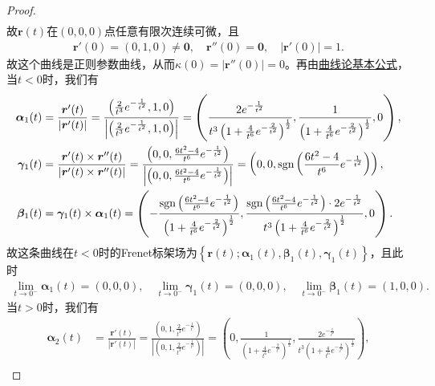 \documentclass[../../main.tex]{subfiles}%
\begin{document}
\begin{proof}
\begin{align*}
\end{align*}
故$\bm{r}(t)$在$(0,0,0)$点任意有限次连续可微，且
\begin{align*}
\bm{r}'(0) = \left( 0,1,0 \right) \ne \bm{0}, \quad \bm{r}''(0) = \bm{0}, \quad |\bm{r}'(0)| = 1.
\end{align*}
故这个曲线是正则参数曲线，从而$\kappa(0) = |\bm{r}''(0)| = 0$。再由\hyperref[theorem:曲线论基本公式]{曲线论基本公式}，当$t<0$时，我们有
\begin{align*}
\bm{\alpha}_1(t) &= \frac{\bm{r}'(t)}{|\bm{r}'(t)|} = \frac{\left( \frac{2}{t^3}e^{-\frac{1}{t^2}},1,0 \right)}{\left| \left( \frac{2}{t^3}e^{-\frac{1}{t^2}},1,0 \right) \right|} = \left( \frac{2e^{-\frac{1}{t^2}}}{t^3\left( 1+\frac{4}{t^6}e^{-\frac{2}{t^2}} \right)^{\frac{1}{2}}},\frac{1}{\left( 1+\frac{4}{t^6}e^{-\frac{2}{t^2}} \right)^{\frac{1}{2}}},0 \right), \\
\bm{\gamma}_1(t) &= \frac{\bm{r}'(t) \times \bm{r}''(t)}{|\bm{r}'(t) \times \bm{r}''(t)|} = \frac{\left( 0,0,\frac{6t^2-4}{t^6}e^{-\frac{1}{t^2}} \right)}{\left| \left( 0,0,\frac{6t^2-4}{t^6}e^{-\frac{1}{t^2}} \right) \right|} = \left( 0,0,\operatorname{sgn}\left( \frac{6t^2-4}{t^6}e^{-\frac{1}{t^2}} \right) \right), \\
\bm{\beta}_1(t) &= \bm{\gamma}_1(t) \times \bm{\alpha}_1(t) = \left( -\frac{\operatorname{sgn}\left( \frac{6t^2-4}{t^6}e^{-\frac{1}{t^2}} \right)}{\left( 1+\frac{4}{t^6}e^{-\frac{2}{t^2}} \right)^{\frac{1}{2}}},\frac{\operatorname{sgn}\left( \frac{6t^2-4}{t^6}e^{-\frac{1}{t^2}} \right) \cdot 2e^{-\frac{1}{t^2}}}{t^3\left( 1+\frac{4}{t^6}e^{-\frac{2}{t^2}} \right)^{\frac{1}{2}}},0 \right).
\end{align*}
故这条曲线在$t<0$时的Frenet标架场为$\left\{ \bm{r}(t);\bm{\alpha}_1(t),\bm{\beta}_1(t),\bm{\gamma}_1(t) \right\}$，且此时
\begin{align*}
\lim\limits_{t\rightarrow 0^-}\bm{\alpha}_1(t) = \left( 0,0,0 \right), \quad \lim\limits_{t\rightarrow 0^-}\bm{\gamma}_1(t) = \left( 0,0,0 \right), \quad
\lim_{t\rightarrow 0^-} \boldsymbol{\beta }_1(t)=\left( 1,0,0 \right) .
\end{align*}
当$t>0$时，我们有
\begin{align*}
\bm{\alpha}_2(t) &= \frac{\bm{r}'(t)}{|\bm{r}'(t)|} = \frac{\left( 0,1,\frac{2}{t^3}e^{-\frac{1}{t^2}} \right)}{\left| \left( 0,1,\frac{2}{t^3}e^{-\frac{1}{t^2}} \right) \right|} = \left( 0,\frac{1}{\left( 1+\frac{4}{t^6}e^{-\frac{2}{t^2}} \right)^{\frac{1}{2}}},\frac{2e^{-\frac{1}{t^2}}}{t^3\left( 1+\frac{4}{t^6}e^{-\frac{2}{t^2}} \right)^{\frac{1}{2}}} \right), \\

\end{align*}
\end{proof}
\end{document}
